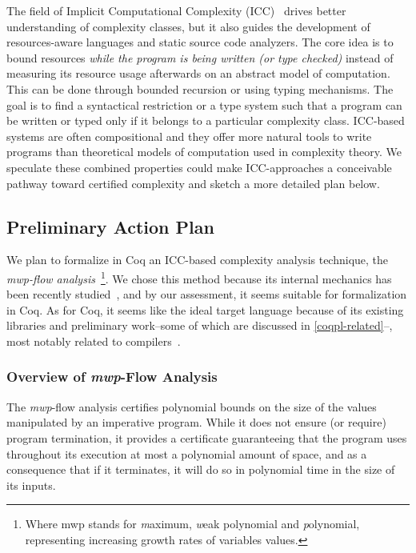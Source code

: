 The field of Implicit Computational Complexity (ICC)~\cite{dallago2011} drives better understanding of complexity classes, but it
also guides the development of resources-aware languages and static source code analyzers.
The core idea is to bound resources \emph{while the program is being written (or type checked)} instead of measuring its resource usage afterwards on an abstract model of computation.
This can be done through \eg bounded recursion or using typing mechanisms.
The goal is to find a syntactical restriction or a type system such that a program can be written or typed only if it belongs to a particular complexity class.
ICC-based systems are often compositional and they offer more natural tools to write programs than theoretical models of computation used in complexity theory.
We speculate these combined properties could make ICC-approaches a conceivable pathway toward certified complexity and sketch a more detailed plan below.

\subsection{Preliminary Action Plan}  %

We plan to formalize in Coq an ICC-based complexity analysis technique, the \emph{mwp-flow analysis}~\cite{jones2009}\footnote{Where mwp stands for \emph{m}aximum, \emph{w}eak polynomial and \emph{p}olynomial, representing increasing growth rates of variables values.}.
We chose this method because its internal mechanics has been recently studied~\cite{aubert20222}, and by our assessment, it seems suitable for formalization in Coq.
As for Coq, it seems like the ideal target language because of its existing libraries and preliminary work--some of which are discussed in \autoref{coqpl-related}--, most notably related to compilers~\cite{leroy2009}.

\subsubsection{Overview of \emph{mwp}-Flow Analysis}

The \emph{mwp}-flow analysis certifies polynomial bounds on the size of the values manipulated by
an imperative program.
While it does not ensure (or require) program termination, it provides a certificate guaranteeing that the program uses throughout its execution at
most a polynomial amount of space, and as a consequence that if it terminates, it will do so in polynomial time in the size of its inputs.

